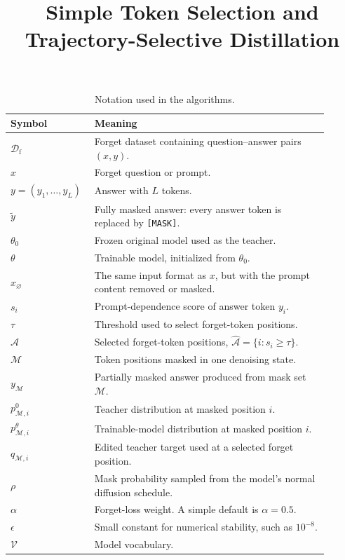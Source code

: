 \documentclass{article}
\title{Simple Token Selection and Trajectory-Selective Distillation}
\author{}
\date{}
\newcommand{\Df}{\mathcal{D}_{\mathrm f}}
\newcommand{\V}{\mathcal{V}}
\newcommand{\Ahat}{\widehat{\mathcal A}}
\newcommand{\Mset}{\mathcal M}
\begin{document}
\maketitle

\begin{table}[h]
\centering
\caption{Notation used in the algorithms.}
\label{tab:notation}
\small
\renewcommand{\arraystretch}{1.18}
\begin{tabular}{>{\raggedright\arraybackslash}p{0.20\linewidth}
                >{\raggedright\arraybackslash}p{0.70\linewidth}}
\toprule
\textbf{Symbol} & \textbf{Meaning} \\
\midrule
$\Df$ & Forget dataset containing question--answer pairs $(x,y)$. \\
$x$ & Forget question or prompt. \\
$y=(y_1,\ldots,y_L)$ & Answer with $L$ tokens. \\
$\widetilde y$ & Fully masked answer: every answer token is replaced by \texttt{[MASK]}. \\
$\theta_0$ & Frozen original model used as the teacher. \\
$\theta$ & Trainable model, initialized from $\theta_0$. \\
$x_{\varnothing}$ & The same input format as $x$, but with the prompt content removed or masked. \\
$s_i$ & Prompt-dependence score of answer token $y_i$. \\
$\tau$ & Threshold used to select forget-token positions. \\
$\Ahat$ & Selected forget-token positions, $\Ahat=\{i:s_i\geq\tau\}$. \\
$\Mset$ & Token positions masked in one denoising state. \\
$y_{\Mset}$ & Partially masked answer produced from mask set $\Mset$. \\
$p^0_{\Mset,i}$ & Teacher distribution at masked position $i$. \\
$p^{\theta}_{\Mset,i}$ & Trainable-model distribution at masked position $i$. \\
$q_{\Mset,i}$ & Edited teacher target used at a selected forget position. \\
$\rho$ & Mask probability sampled from the model's normal diffusion schedule. \\
$\alpha$ & Forget-loss weight. A simple default is $\alpha=0.5$. \\
$\epsilon$ & Small constant for numerical stability, such as $10^{-8}$. \\
$\V$ & Model vocabulary. \\
\bottomrule
\end{tabular}
\end{table}
\end{document}
